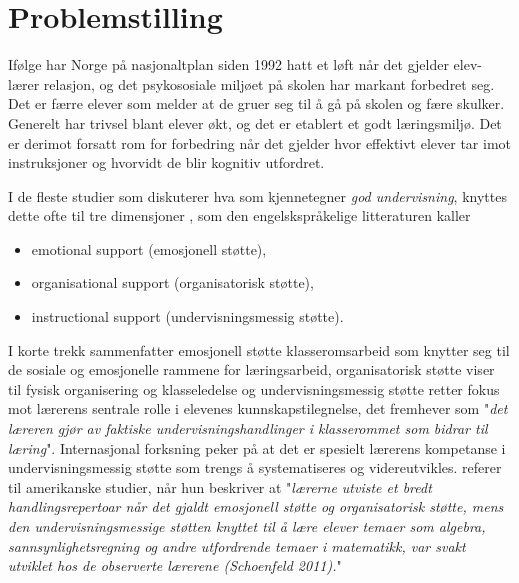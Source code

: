 \documentclass[main.tex]{subfiles}
\begin{document}
\section{Problemstilling}
Ifølge  har Norge på nasjonaltplan siden 1992 hatt et løft når det gjelder elev-lærer 
relasjon, og det psykososiale miljøet på skolen har markant forbedret seg. Det er færre elever 
som melder at de gruer seg til å gå på skolen og fære skulker. Generelt har trivsel 
blant elever økt, og det er etablert et godt læringsmiljø. Det er derimot forsatt rom for forbedring 
når det gjelder hvor effektivt elever tar imot instruksjoner og hvorvidt de blir kognitiv utfordret. 
\newline

I de fleste studier som diskuterer hva som kjennetegner \emph{god undervisning}, knyttes 
dette ofte til tre dimensjoner , som den engelskspråkelige litteraturen kaller 
\begin{itemize}
\item emotional support (emosjonell støtte),
\item organisational support (organisatorisk støtte),
\item instructional support (undervisningsmessig støtte).
\end{itemize}
I korte trekk sammenfatter emosjonell støtte klasseromsarbeid som knytter
seg til de sosiale og emosjonelle rammene for læringsarbeid, %
organisatorisk støtte viser til fysisk organisering og klasseledelse %
og undervisningsmessig støtte retter fokus mot lærerens sentrale rolle i elevenes kunnskapstilegnelse,
det  fremhever som
"\emph{det læreren gjør av faktiske undervisningshandlinger i klasserommet som bidrar til læring}".
Internasjonal forksning peker på at det er spesielt lærerens kompetanse i undervisningsmessig støtte 
som trengs å systematiseres og videreutvikles.  referer til amerikanske studier, når hun
beskriver at
\newline
\newline
"\emph{lærerne utviste et bredt handlingsrepertoar når det gjaldt emosjonell støtte og organisatorisk
støtte, mens den undervisningsmessige støtten knyttet til å lære elever temaer som algebra, sannsynlighetsregning
og andre utfordrende temaer i matematikk, var svakt utviklet hos de observerte lærerene (Schoenfeld 2011).}"
\newline
\newline
\end{document}
